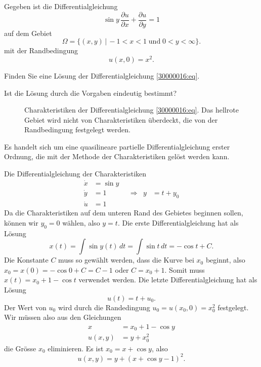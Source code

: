 Gegeben ist die Differentialgleichung
\begin{equation}
\sin y\,\frac{\partial u}{\partial x}
+
\frac{\partial u}{\partial y}
=
1
\label{30000016:eq}
\end{equation}
auf dem Gebiet 
\[
\Omega=\{ (x,y) \,|\, -1<x<1\;\text{und}\; 0<y<\infty\}.
\]
mit der Randbedingung
\[
u(x,0) = x^2.
\]
\begin{teilaufgaben}
\item
Finden Sie eine Lösung der Differentialgleichung \eqref{30000016:eq}.
\item
Ist die Lösung durch die Vorgaben eindeutig bestimmt?
\end{teilaufgaben}

\begin{loesung}
\begin{figure}
\centering
{}
\caption{Charakteristiken der Differentialgleichung
\eqref{30000016:eq}.
Das hellrote Gebiet wird nicht von Charakteristiken überdeckt, die von der
Randbedingung festgelegt werden.
\label{30000016:char}}
\end{figure}
Es handelt sich um eine quasilineare partielle Differentialgleichung erster
Ordnung, die mit der Methode der Charakteristiken gelöst werden kann.
\begin{teilaufgaben}
\item
Die Differentialgleichung der Charakteristiken
\[
\begin{aligned}
\dot x&= \sin y &&&&\\
\dot y&= 1 &&\Rightarrow &y&=t+y_0\\
\dot u&= 1 &&&&
\end{aligned}
\]
Da die Charakteristiken auf dem unteren Rand des Gebietes beginnen sollen,
können wir $y_0=0$ wählen, also $y=t$. 
Die erste Differentialgleichung hat als Lösung
\[
x(t) = \int \sin y(t)\,dt = \int \sin t\,dt = -\cos t + C.
\]
Die Konstante $C$ muss so gewählt werden, dass die Kurve bei $x_0$
beginnt, also $x_0=x(0)=-\cos 0 + C=C-1$ oder $C=x_0+1$.
Somit muss $x(t)=x_0+1-\cos t$ verwendet werden.
Die letzte Differentialgleichung hat als Lösung
\[
u(t) = t + u_0.
\]
Der Wert von $u_0$ wird durch die Randedingung $u_0=u(x_0,0)=x_0^2$
festgelegt.
Wir müssen also aus den Gleichungen
\begin{align*}
x&=x_0+1-\cos y\\
u(x,y)&=y+x_0^2
\end{align*}
die Grösse $x_0$ eliminieren.
Es ist $x_0=x+\cos y$, also
\begin{equation}
u(x,y) = y + (x+\cos y-1)^2.
\label{30000016:l}
\end{equation}


\end{teilaufgaben}
\end{loesung}
